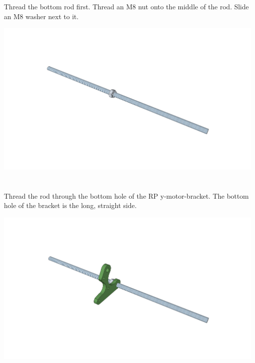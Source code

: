 \documentclass[twoside,openany,a4paper,titlepage]{memoir}
\begin{document}
	\section{}
	Thread the bottom rod first. Thread an M8 nut onto the middle of the rod. Slide an M8 washer next to it.\\
	\begin{center}
		\includegraphics[width=1\linewidth]{graphics/ch2_1.png}
	\end{center}
	
	\section{}
	Thread the rod through the bottom hole of the RP y-motor-bracket. The bottom hole of the bracket is the
	long, straight side.\\
	\begin{center}
		\includegraphics[width=1\linewidth]{graphics/ch2_2.png}
	\end{center}
	
\end{document}
